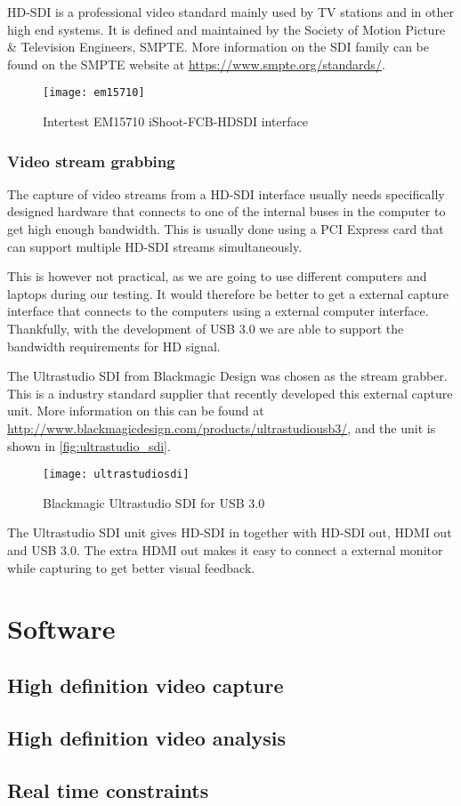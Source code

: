 HD-SDI is a professional video standard mainly used by TV stations and in other high end systems. It is 
defined and maintained by the Society of Motion Picture \& Television Engineers, SMPTE. More information 
on the SDI family can be found on the SMPTE website at \url{https://www.smpte.org/standards/}.

\begin{figure}[htbp]
	\centering
	\texttt{[image: em15710]}
	\caption{Intertest EM15710 iShoot-FCB-HDSDI interface}
	\label{fig:em15710}
\end{figure}

\subsubsection{Video stream grabbing}
The capture of video streams from a HD-SDI interface usually needs specifically designed hardware that 
connects to one of the internal buses in the computer to get high enough bandwidth. This is usually 
done using a PCI Express card that can support multiple HD-SDI streams simultaneously. 

This is 
however not practical, as we are going to use different computers and laptops during our testing. 
It would therefore be better to get a external capture interface that connects to the computers using a 
external computer interface. Thankfully, with the development of USB 3.0 we are able 
to support the bandwidth requirements for HD signal.

The Ultrastudio SDI from Blackmagic Design was chosen as the stream grabber. This is a industry standard 
supplier that recently developed this external capture unit. More information on this can be found at 
\url{http://www.blackmagicdesign.com/products/ultrastudiousb3/}, and the unit is shown in \vref{fig:ultrastudio_sdi}.

\begin{figure}[htbp]
	\centering
	\texttt{[image: ultrastudiosdi]}
	\caption{Blackmagic Ultrastudio SDI for USB 3.0}
	\label{fig:ultrastudio_sdi}
\end{figure}

The Ultrastudio SDI unit gives HD-SDI in together with HD-SDI out, HDMI out and USB 3.0. The 
extra HDMI out makes it easy to connect a external monitor while capturing to get better visual feedback.



\section{Software}

\subsection{High definition video capture}

\subsection{High definition video analysis}

\subsection{Real time constraints}

